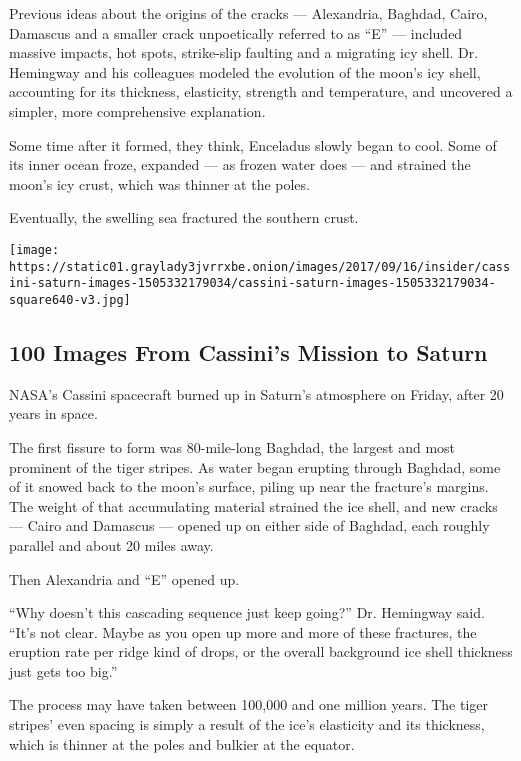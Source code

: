 Previous ideas about the origins of the cracks --- Alexandria, Baghdad,
Cairo, Damascus and a smaller crack unpoetically referred to as ``E''
--- included massive impacts, hot spots, strike-slip faulting and a
migrating icy shell. Dr. Hemingway and his colleagues modeled the
evolution of the moon's icy shell, accounting for its thickness,
elasticity, strength and temperature, and uncovered a simpler, more
comprehensive explanation.

Some time after it formed, they think, Enceladus slowly began to cool.
Some of its inner ocean froze, expanded --- as frozen water does --- and
strained the moon's icy crust, which was thinner at the poles.

Eventually, the swelling sea fractured the southern crust.

\href{https://www.nytimes3xbfgragh.onion/interactive/2017/09/14/science/cassini-saturn-images.html}{}

\texttt{[image: https://static01.graylady3jvrrxbe.onion/images/2017/09/16/insider/cassini-saturn-images-1505332179034/cassini-saturn-images-1505332179034-square640-v3.jpg]}

\hypertarget{100-images-from-cassinis-mission-to-saturn}{%
\subsection{100 Images From Cassini's Mission to
Saturn}\label{100-images-from-cassinis-mission-to-saturn}}

NASA's Cassini spacecraft burned up in Saturn's atmosphere on Friday,
after 20 years in space.

The first fissure to form was 80-mile-long Baghdad, the largest and most
prominent of the tiger stripes. As water began erupting through Baghdad,
some of it snowed back to the moon's surface, piling up near the
fracture's margins. The weight of that accumulating material strained
the ice shell, and new cracks --- Cairo and Damascus --- opened up on
either side of Baghdad, each roughly parallel and about 20 miles away.

Then Alexandria and ``E'' opened up.

``Why doesn't this cascading sequence just keep going?'' Dr. Hemingway
said. ``It's not clear. Maybe as you open up more and more of these
fractures, the eruption rate per ridge kind of drops, or the overall
background ice shell thickness just gets too big.''

The process may have taken between 100,000 and one million years. The
tiger stripes' even spacing is simply a result of the ice's elasticity
and its thickness, which is thinner at the poles and bulkier at the
equator.

